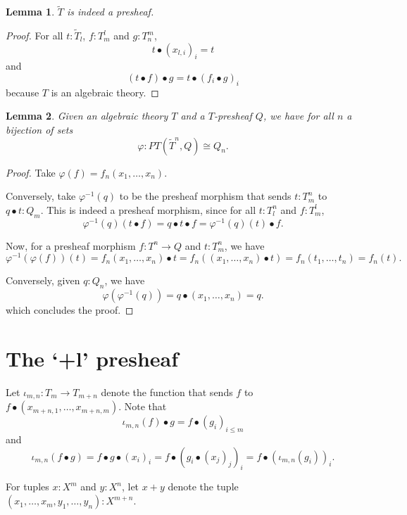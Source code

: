 \documentclass[a4paper]{amsbook}
\newtheorem{lemma}{Lemma}
\theoremstyle{definition}
\theoremstyle{remark}
\begin{document}
  \begin{lemma}
    $ \tilde T $ is indeed a presheaf.
  \end{lemma}
  \begin{proof}
    For all $ t: \tilde T_l $, $ f: T_m^l $ and $ g: T_n^m $,
    \[ t \bullet (x_{l, i})_i = t \]
    and
    \[ (t \bullet f) \bullet g = t \bullet (f_i \bullet g)_i \]
    because $ T $ is an algebraic theory.
  \end{proof}

  \begin{lemma}
    Given an algebraic theory $ T $ and a $ T $-presheaf $ Q $, we have for all $ n $ a bijection of sets
    \[ \varphi: PT(\tilde T^n, Q) \cong Q_n. \]
  \end{lemma}
  \begin{proof}
    Take $ \varphi(f) = f_n(x_1, \dots, x_n) $.

    Conversely, take $ \varphi^{-1}(q) $ to be the presheaf morphism that sends $ t: T^n_m $ to $ q \bullet t : Q_m $. This is indeed a presheaf morphism, since for all $ t: T^n_l $ and $ f: T^l_m $,
    \[ \varphi^{-1}(q)(t \bullet f) = q \bullet t \bullet f = \varphi^{-1}(q)(t) \bullet f. \]

    Now, for a presheaf morphism $ f: T^n \to Q $ and $ t: T^n_m $, we have
    \[ \varphi^{-1}(\varphi(f))(t) = f_n(x_1, \dots, x_n) \bullet t = f_n((x_1, \dots, x_n) \bullet t) = f_n(t_1, \dots, t_n) = f_n(t). \]

    Conversely, given $ q: Q_n $, we have
    \[ \varphi(\varphi^{-1}(q)) = q \bullet (x_1, \dots, x_n) = q. \]
    which concludes the proof.
  \end{proof}

  \section{The `+l' presheaf}

  Let $ \iota_{m, n} : T_m \to T_{m + n} $ denote the function that sends $ f $ to $ f \bullet (x_{m + n, 1}, \dots, x_{m + n, m}) $. Note that
  \[ \iota_{m, n}(f) \bullet g = f \bullet (g_i)_{i \leq m} \]
  and
  \[ \iota_{m, n}(f \bullet g) = f \bullet g \bullet (x_i)_i = f \bullet (g_i \bullet (x_j)_j)_i = f \bullet (\iota_{m, n}(g_i))_i. \]

  For tuples $ x : X^m $ and $ y: X^n $, let $ x + y $ denote the tuple $ (x_1, \dots, x_m, y_1, \dots, y_n) : X^{m + n} $.
\end{document}
